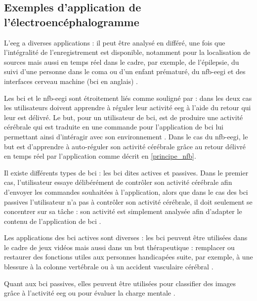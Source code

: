 \subsection{Exemples d'application de l'électroencéphalogramme}

L'\gls{eeg} a diverses applications : il peut être analysé en différé, une fois que l'intégralité de l'enregistrement est disponible, notamment pour la localisation de sources \citep{Latif2006} 
mais aussi en temps réel dans le cadre, par exemple, de l'épilepsie, du suivi d'une personne dans 
le coma ou d'un enfant prématuré, du \gls{nfb}-\gls{eegi} et des interfaces cerveau machine (\gls{bci} en anglais) \citep{Li2010}. 

Les \gls{bci} et le \gls{nfb}-\gls{eegi} sont étroitement liés comme souligné par \citet{Jeunet2018} : dans les deux cas les utilisateurs doivent apprendre à réguler leur activité \gls{eeg} à l'aide du retour 
qui leur est délivré. Le but, pour un utilisateur de \gls{bci}, est de produire une activité cérébrale qui est traduite en une commande pour l'application de \gls{bci} lui permettant ainsi d'intéragir 
avec son environnement \citep{Enriquez2017, Birbaumer2009}. Dans le cas du \gls{nfb}-\gls{eegi}, le but est d'apprendre à auto-réguler son activité cérébrale grâce au retour délivré en temps réel par l'application 
\citep{Enriquez2017, Jeunet2018} comme décrit en \ref{principe_nfb}.

Il existe différents types de \gls{bci} : les \gls{bci} dites actives et passives. Dans le premier cas, l'utilisateur essaye délibérément de contrôler son activité cérébrale afin
d'envoyer les commandes souhaitées à l'application, alors que dans le cas des \gls{bci} passives l'utilisateur n'a pas à contrôler son activité cérébrale, il doit seulement
se concentrer sur sa tâche : son activité est simplement analysée afin d'adapter le contenu de l'application de \gls{bci} \citep{George2014}. 

Les applications des \gls{bci} actives sont diverses : les \gls{bci} peuvent être utilisées dans le cadre de jeux vidéos \citep{Kerous2018} mais aussi dans un but thérapeutique : remplacer ou
restaurer des fonctions utiles aux personnes handicapées suite, par exemple, à une blessure à la colonne vertébrale ou à un accident vasculaire cérébral \citep{Shih2012}. 

Quant aux \gls{bci} passives, elles peuvent être utilisées pour classifier des images grâce à l'activité \gls{eeg} ou pour évaluer la charge mentale \citep{George2014}.   

